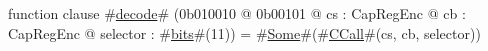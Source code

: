 function clause #\hyperref[zdecode]{decode}# (0b010010 @ 0b00101 @ cs : CapRegEnc @ cb : CapRegEnc @ selector : #\hyperref[zbits]{bits}#(11)) = #\hyperref[zSome]{Some}#(#\hyperref[zCCall]{CCall}#(cs, cb, selector))
